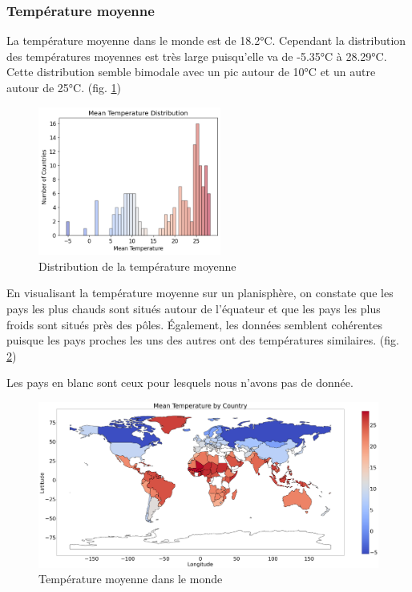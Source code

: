 \documentclass[12pt]{iEEEtran}
\begin{document}
\subsubsection{Température moyenne}

La température moyenne dans le monde est de 18.2°C. Cependant la distribution des températures
moyennes est très large puisqu'elle va de -5.35°C à 28.29°C. Cette distribution semble
bimodale avec un pic autour de 10°C et un autre autour de 25°C. (fig. \ref{fig:temp})

\begin{figure}[h]
    \centering
    \includegraphics[width=6cm]{img/temp.png}
    \caption{Distribution de la température moyenne}
    \label{fig:temp}
\end{figure}

En visualisant la température moyenne sur un planisphère, on constate que les pays les plus
chauds sont situés autour de l'équateur et que les pays les plus froids sont situés près des
pôles. Également, les données semblent cohérentes puisque les pays proches les uns des autres
ont des températures similaires. (fig. \ref{fig:temp_world})

Les pays en blanc sont ceux pour lesquels nous n'avons pas de donnée.

\begin{figure}[h]
    \centering
    \includegraphics[width=\columnwidth]{img/temp_world.png}
    \caption{Température moyenne dans le monde}
    \label{fig:temp_world}
\end{figure}
\end{document}

